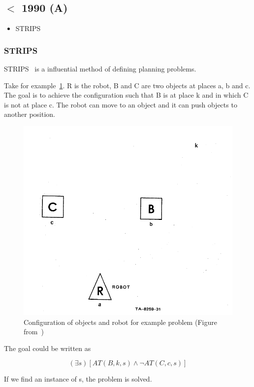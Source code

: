 \documentclass[runningheads,a4paper]{llncs}
\begin{document}
\subsection{$<$ 1990 (A)}

\begin{itemize}
	\item STRIPS \cite{fikes1971strips}
\end{itemize}

\subsubsection{STRIPS}

STRIPS~\cite{fikes1971strips} is a influential method of defining planning
problems.

Take for example~\ref{fig:strips}. R is the robot, B and C are two objects at
places a, b and c. The goal is to achieve the configuration such that B is at
place k and in which C is not at place c. The robot can move to an object and
it can push objects to another position.

\begin{figure}[htb]%
\includegraphics[width=0.8\columnwidth]{strips-example.pdf}%
\caption{Configuration of objects and robot for example problem (Figure from~\cite{fikes1971strips})}%
\label{fig:strips}%
\end{figure}

The goal could be written as

\[
	(\exists s) [ AT(B,k,s) \land \neg AT(C,c,s) ]
\]

If we find an instance of s, the problem is solved.
\end{document}
